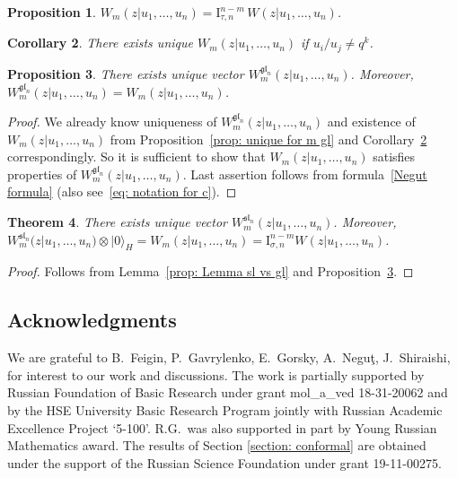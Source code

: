 \documentclass[pdftex]{sigma}
\numberwithin{equation}{section}
\newtheorem{Theorem}{Theorem}[section]
\newtheorem{Proposition}[Theorem]{Proposition}
\newtheorem{Corollary}[Theorem]{Corollary}
\theoremstyle{definition}
\newcommand{\vac}{|0 \rangle}
\newcommand{\I}{\mathrm{I}}
\begin{document}
\begin{Proposition}$W_m (z|u_1, \dots, u_n) = \I^{n-m}_{\tau,n} \, W (z|u_1, \dots, u_n)$.
\end{Proposition}

\begin{Corollary} \label{corollary: uniq Whit sl}There exists unique $W_{m} (z|u_1, \dots, u_n)$ if $u_i/u_j \neq q^k$.
\end{Corollary}

\begin{Proposition} \label{prop: Whit gl vs qD}There exists unique vector $W_m^{\mathfrak{gl}_n}(z| u_1, \dots, u_n)$. Moreover, $W_m^{\mathfrak{gl}_n}(z| u_1, \dots,\allowbreak u_n) = W_{m} (z|u_1, \dots, u_n)$.
\end{Proposition}
\begin{proof}We already know uniqueness of $W_m^{\mathfrak{gl}_n}(z| u_1, \dots, u_n)$ and existence of $W_m (z|u_1, \dots, u_n)$ from Proposition~\ref{prop: unique for m gl} and Corollary~\ref{corollary: uniq Whit sl} correspondingly. So it is sufficient to show that $W_{m} (z|u_1, \dots, u_n)$ satisfies properties of $W_m^{\mathfrak{gl}_n}(z| u_1, \dots, u_n)$. Last assertion follows from formula~\eqref{Negut formula} (also see~\eqref{eq: notation for c}).
\end{proof}

\begin{Theorem}There exists unique vector $W_m^{\mathfrak{sl}_n}(z| u_1, \dots, u_n)$. Moreover, $W_m^{\mathfrak{sl}_n}(z| u_1, \dots, u_n) \otimes \vac_H = W_{m} (z|u_1, \dots, u_n)= \I^{n-m}_{\sigma,n}  W (z|u_1, \dots, u_n)$.
\end{Theorem}
\begin{proof}Follows from Lemma~\ref{prop: Lemma sl vs gl} and Proposition~\ref{prop: Whit gl vs qD}.
\end{proof}

\subsection*{Acknowledgments} We are grateful to B.~Feigin, P.~Gavrylenko, E.~Gorsky, A.~Negu\c{t}, J.~Shiraishi, for interest to our work and discussions. The work is partially supported by Russian Foundation of Basic Research under grant mol\_a\_ved 18-31-20062 and by the HSE University Basic Research Program jointly with Russian Academic Excellence Project `5-100’. R.G.\ was also supported in part by Young Russian Mathematics award. The results of Section \ref{section: conformal} are obtained under the support of the Russian Science Foundation under grant 19-11-00275.
\end{document}
